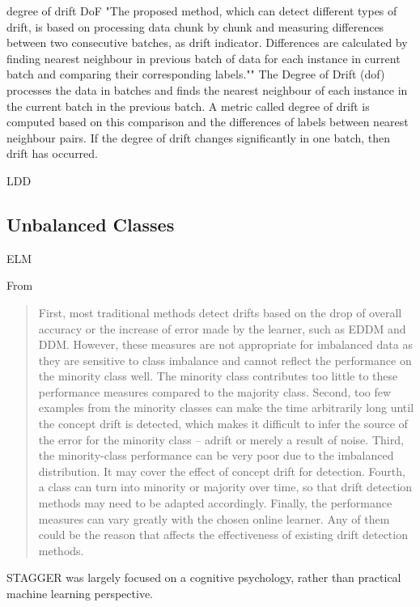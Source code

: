degree of drift DoF
"The proposed method, which can detect different types of drift, is based on processing data chunk by chunk and measuring differences between two consecutive batches, as drift indicator. Differences are calculated by finding nearest neighbour in previous batch of data for each instance in current batch and comparing their corresponding labels.""
The Degree of Drift (dof) processes the data in batches and finds the nearest neighbour of each instance in the current batch in the previous batch. A metric called degree of drift is computed based on this comparison and the differences of labels between nearest neighbour pairs. If the degree of drift changes significantly in one batch, then drift has occurred.

LDD

\subsection{Unbalanced Classes}

ELM

From \cite{DDM_OCI}
\begin{quote}
  First,  most  traditional  methods  detect  drifts based on the drop of overall accuracy or the increase of error made  by  the  learner,  such  as  EDDM  and  DDM.  However, these  measures  are  not  appropriate  for  imbalanced  data  as they  are  sensitive  to  class  imbalance  and  cannot  reflect the  performance  on  the  minority  class  well.  The  minority class  contributes  too  little  to  these  performance  measures compared  to  the  majority  class.  Second,  too  few  examples from the minority classes can make the time arbitrarily long until  the  concept  drift  is  detected,  which  makes  it  difficult to  infer  the  source  of  the  error  for  the  minority  class  –  adrift  or  merely  a  result  of  noise.  Third,  the  minority-class  performance  can  be  very  poor  due  to  the  imbalanced distribution.  It  may  cover  the  effect  of  concept  drift  for detection. Fourth, a class can turn into minority or majority over  time,  so  that  drift  detection  methods  may  need  to  be adapted accordingly. Finally, the performance measures can vary  greatly  with  the  chosen  online  learner.  Any  of  them could be the reason that affects the effectiveness of existing drift detection methods.
\end{quote}


STAGGER was largely focused on a cognitive psychology, rather than practical machine learning perspective.

